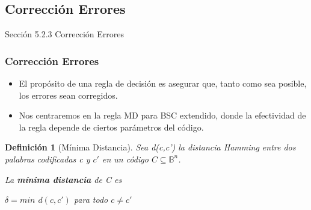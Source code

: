 \documentclass{beamer}
\theoremstyle{plain}
\newtheorem{definicion} [Definicion]{Definición}
\theoremstyle{example}
\theoremstyle{example}
\begin{document}
\subsection{Corrección Errores}
\begin{frame}   \footnotesize
{
\begin{block}{Sección 5.2.3}
Corrección Errores
\end{block}
}
\end{frame} 

\begin{frame}  \frametitle{Corrección Errores}\small 



 
\begin{itemize} 

\item  El propósito de una regla de decisión es asegurar que, tanto como sea posible, los errores sean corregidos. 

\item Nos centraremos en la regla MD para BSC extendido, donde la efectividad de la regla depende de ciertos parámetros del código.

\end{itemize} 

\begin{definicion}[Mínima Distancia] 
Sea d(c,c') la distancia Hamming entre dos palabras codificadas c y $c'$ en un código $C \subseteq \mathbb{B}^n$. 

La \textbf{mínima distancia} de C es 

\begin{center}
$\delta= min$ $d(c, c')$ para todo $c \neq c'$
\end{center}

\end{definicion}

\end{frame} 
\end{document}
